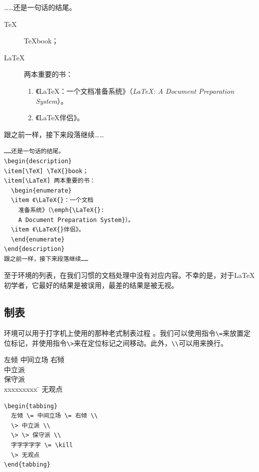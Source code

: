 \begin{codelist}[2.9]{
    ……还是一句话的结尾。
    \begin{description}
    \item[\TeX] \TeX{}book；
    \item[\LaTeX] 两本重要的书：
      \begin{enumerate}
      \item 《\LaTeX{}：一个文档准备系统》（\emph{\LaTeX{}: A Document Preparation System}）。
      \item 《\LaTeX{}伴侣》。
      \end{enumerate}
    \end{description}
    跟之前一样，接下来段落继续……
}
\begin{verbatim}
……还是一句话的结尾。
\begin{description}
\item[\TeX] \TeX{}book；
\item[\LaTeX] 两本重要的书：
  \begin{enumerate}
  \item 《\LaTeX{}：一个文档
    准备系统》（\emph{\LaTeX{}: 
    A Document Preparation System}）。
  \item 《\LaTeX{}伴侣》。
  \end{enumerate}
\end{description}
跟之前一样，接下来段落继续……\end{verbatim}
\end{codelist}

至于环境的列表，在我们习惯的文档处理中没有对应内容。不幸的是，对于\LaTeX 初学者，它最好的结果是被误用，最差的结果是被无视。

\subsection{制表}

环境可以用于打字机上使用的那种老式制表过程%
。我们可以使用指令\verb|\=|来放置定位标记，并使用指令\verb|\>|来在定位标记之间移动。此外，\verb|\\|可以用来换行。

\begin{codelist}[2.10]{
  \begin{tabbing}
    左倾 \= 中间立场 \= 右倾 \\
    \> 中立派 \\
    \> \> 保守派 \\
    xxxxxxxxx \= \kill
    \> 无观点
    \end{tabbing}
}
\begin{verbatim}
\begin{tabbing}
  左倾 \= 中间立场 \= 右倾 \\
  \> 中立派 \\
  \> \> 保守派 \\
  字字字字字 \= \kill
  \> 无观点
\end{tabbing}\end{verbatim}
\end{codelist}

